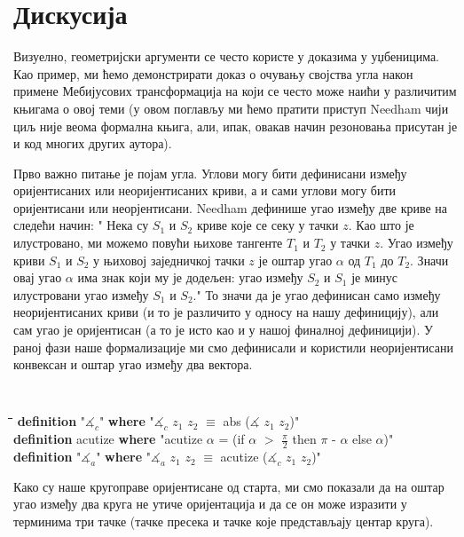 \section{Дискусија}
\label{sec:discuss}
Визуелно, геометријски аргументи се често користе у доказима у
уџбеницима. Као пример, ми ћемо демонстрирати доказ о очувању својства
угла након примене Мебијусових трансформација на који се често може
наићи у различитим књигама о овој теми (у овом поглављу ми ћемо
пратити приступ Needham \cite{needham} чији циљ није веома формална
књига, али, ипак, овакав начин резоновања присутан је и код многих
других аутора).

Прво важно питање је појам угла. Углови могу бити дефинисани између
оријентисаних или неоријентисаних криви, а и сами углови могу бити
оријентисани или неорјентисани.  Needham дефинише угао између две
криве на следећи начин: " Нека су $S_1$ и $S_2$ криве које се секу у
тачки $z$. Као што је илустровано, ми можемо повући њихове тангенте
$T_1$ и $T_2$ у тачки $z$. Угао између криви $S_1$ и $S_2$ у њиховој
заједничкој тачки $z$ је оштар угао $\alpha$ од $T_1$ до $T_2$. Значи
овај угао $\alpha$ има знак који му је додељен: угао између $S_2$ и
$S_1$ је минус илустровани угао између $S_1$ и $S_2$." То значи да је
угао дефинисан само између неоријентисаних криви (и то је различито у
односу на нашу дефиницију), али сам угао је оријентисан (а то је исто
као и у нашој финалној дефиницији).  У раној фази наше формализације
ми смо дефинисали и користили неоријентисани конвексан и оштар угао
између два вектора.

{\tt
  \begin{tabbing}
    \hspace{5mm}\=\hspace{5mm}\=\hspace{5mm}\=\hspace{5mm}\=\hspace{5mm}\=\kill
{\bf definition} "$\measuredangle_c$" {\bf where} "$\measuredangle_c$ $z_1$ $z_2$ $\equiv$ abs ($\measuredangle$ $z_1$ $z_2$)"\\
{\bf definition} acutize {\bf where} "acutize $\alpha$ = (if $\alpha$ $>$ $\frac{\pi}{2}$ then $\pi$ - $\alpha$ else $\alpha$)"\\
{\bf definition} "$\measuredangle_a$" {\bf where} "$\measuredangle_a$ $z_1$ $z_2$ $\equiv$ acutize ($\measuredangle_c$ $z_1$ $z_2$)"
  \end{tabbing}
}

Како су наше кругоправе оријентисане од старта, ми смо показали да на
оштар угао између два круга не утиче оријентација и да се он може
изразити у терминима три тачке (тачке пресека и тачке које
представљају центар круга).

